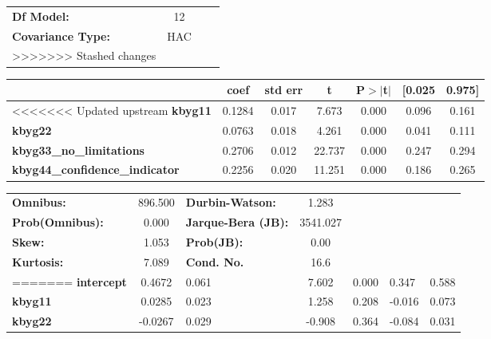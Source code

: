 \begin{center}
\begin{tabular}{lclc}
\textbf{Df Model:}                           &            12       & \textbf{                     } &             \\
\textbf{Covariance Type:}                    &         HAC         & \textbf{                     } &             \\
>>>>>>> Stashed changes
\bottomrule
\end{tabular}
\begin{tabular}{lcccccc}
                                       & \textbf{coef} & \textbf{std err} & \textbf{t} & \textbf{P$> |$t$|$} & \textbf{[0.025} & \textbf{0.975]}  \\
\midrule
<<<<<<< Updated upstream
\textbf{kbyg11}                        &       0.1284  &        0.017     &     7.673  &         0.000        &        0.096    &        0.161     \\
\textbf{kbyg22}                        &       0.0763  &        0.018     &     4.261  &         0.000        &        0.041    &        0.111     \\
\textbf{kbyg33\_no\_limitations}       &       0.2706  &        0.012     &    22.737  &         0.000        &        0.247    &        0.294     \\
\textbf{kbyg44\_confidence\_indicator} &       0.2256  &        0.020     &    11.251  &         0.000        &        0.186    &        0.265     \\
\bottomrule
\end{tabular}
\begin{tabular}{lclc}
\textbf{Omnibus:}       & 896.500 & \textbf{  Durbin-Watson:     } &    1.283  \\
\textbf{Prob(Omnibus):} &   0.000 & \textbf{  Jarque-Bera (JB):  } & 3541.027  \\
\textbf{Skew:}          &   1.053 & \textbf{  Prob(JB):          } &     0.00  \\
\textbf{Kurtosis:}      &   7.089 & \textbf{  Cond. No.          } &     16.6  \\
=======
\textbf{intercept}                           &       0.4672  &        0.061     &     7.602  &         0.000        &        0.347    &        0.588     \\
\textbf{kbyg11}                              &       0.0285  &        0.023     &     1.258  &         0.208        &       -0.016    &        0.073     \\
\textbf{kbyg22}                              &      -0.0267  &        0.029     &    -0.908  &         0.364        &       -0.084    &        0.031     \\

\end{tabular}
\end{center}
